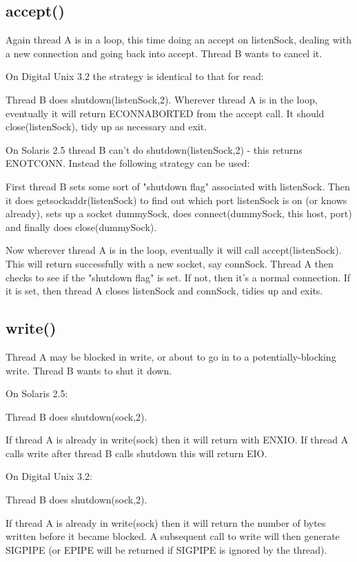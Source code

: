 \documentclass[11pt,twoside,onecolumn]{article}
\begin{document}
\subsection{accept()}

Again thread A is in a loop, this time doing an accept on listenSock, dealing
with a new connection and going back into accept.  Thread B wants to cancel it.

On Digital Unix 3.2 the strategy is identical to that for read:

Thread B does shutdown(listenSock,2).  Wherever thread A is in the loop,
eventually it will return ECONNABORTED from the accept call.  It should
close(listenSock), tidy up as necessary and exit.

On Solaris 2.5 thread B can't do shutdown(listenSock,2) - this returns
ENOTCONN.  Instead the following strategy can be used:

First thread B sets some sort of "shutdown flag" associated with listenSock.
Then it does getsockaddr(listenSock) to find out which port listenSock is on
(or knows already), sets up a socket dummySock, does connect(dummySock, this
host, port) and finally does close(dummySock).

Now wherever thread A is in the loop, eventually it will call
accept(listenSock).  This will return successfully with a new socket, say
connSock.  Thread A then checks to see if the "shutdown flag" is set.  If not,
then it's a normal connection.  If it is set, then thread A closes listenSock
and connSock, tidies up and exits.


\subsection{write()}

Thread A may be blocked in write, or about to go in to a potentially-blocking
write.  Thread B wants to shut it down.

On Solaris 2.5:

Thread B does shutdown(sock,2).

If thread A is already in write(sock) then it will return with ENXIO.  If
thread A calls write after thread B calls shutdown this will return EIO.


On Digital Unix 3.2:

Thread B does shutdown(sock,2).

If thread A is already in write(sock) then it will return the number of bytes
written before it became blocked.  A subsequent call to write will then
generate SIGPIPE (or EPIPE will be returned if SIGPIPE is ignored by the
thread).
\end{document}
